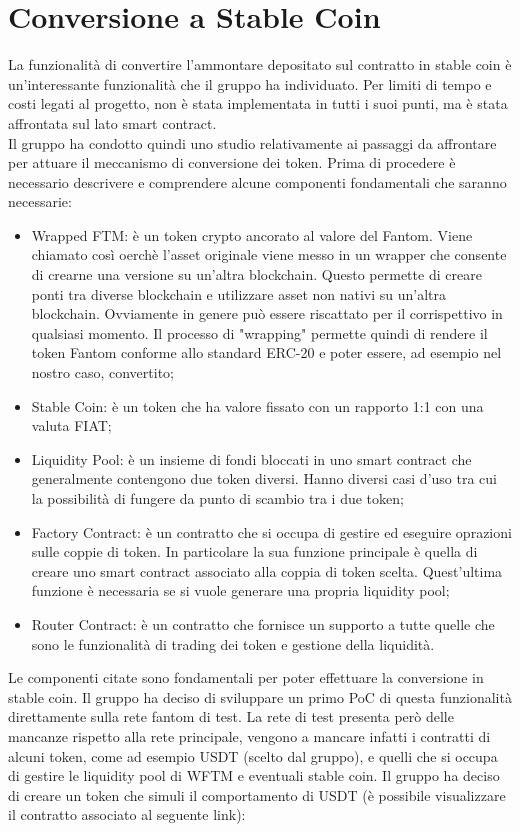 \section{Conversione a Stable Coin}\label{section:stable_coin}

La funzionalità di convertire l'ammontare depositato sul contratto in stable coin è un'interessante funzionalità che il gruppo ha individuato. Per limiti 
di tempo e costi legati al progetto, non è stata implementata in tutti i suoi punti, ma è stata affrontata sul lato smart contract.\\
Il gruppo ha condotto quindi uno studio relativamente ai passaggi da affrontare per attuare il meccanismo di conversione dei token\glo{}.
Prima di procedere è necessario descrivere e comprendere alcune componenti fondamentali che saranno necessarie:

\begin{itemize}
    \item Wrapped FTM: è un token crypto ancorato al valore del Fantom. Viene chiamato così oerchè l'asset originale viene messo in un wrapper che consente di crearne una versione su un'altra blockchain. Questo permette di creare ponti tra diverse blockchain e utilizzare asset non nativi su  un'altra blockchain. Ovviamente in genere può essere riscattato per il corrispettivo in qualsiasi momento. Il processo di "wrapping" permette quindi di rendere il token Fantom conforme allo standard ERC-20 e poter essere, ad esempio nel nostro caso, convertito;
    \item Stable Coin: è un token che ha valore fissato con un rapporto 1:1 con una valuta FIAT\glo{};
    \item Liquidity Pool: è un insieme di fondi bloccati in uno smart contract che generalmente contengono due token diversi. Hanno diversi casi d'uso tra cui la possibilità di fungere da punto di scambio tra i due token;
    \item Factory Contract: è un contratto che si occupa di gestire ed eseguire oprazioni sulle coppie di token. In particolare la sua funzione principale è quella di creare uno smart contract associato alla coppia di token scelta. Quest'ultima funzione è necessaria se si vuole generare una propria liquidity pool;
    \item Router Contract: è un contratto che fornisce un supporto a tutte quelle che sono le funzionalità di trading dei token e gestione della liquidità.
\end{itemize}

Le componenti citate sono fondamentali per poter effettuare la conversione in stable coin. 
Il gruppo ha deciso di sviluppare un primo PoC di questa funzionalità direttamente sulla rete fantom di test. La rete di test presenta però delle mancanze rispetto alla rete principale, vengono a mancare infatti i contratti di alcuni token, come ad esempio USDT (scelto dal gruppo), e quelli che si occupa di gestire le liquidity pool di WFTM e eventuali stable coin.
Il gruppo ha deciso di creare un token che simuli il comportamento di USDT (è possibile visualizzare il contratto associato al seguente link):

